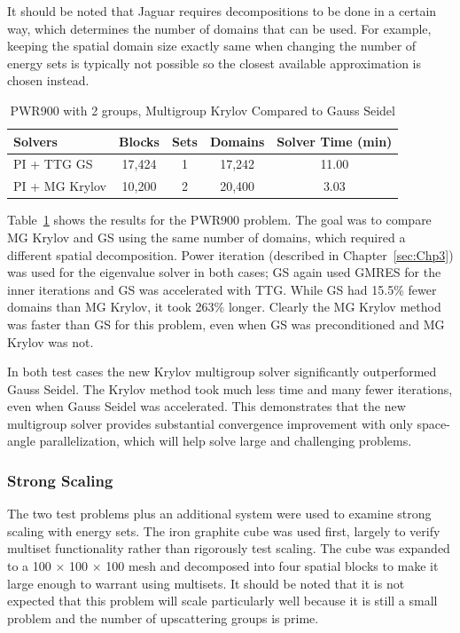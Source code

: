 It should be noted that Jaguar requires decompositions to be done in a certain way, which determines the number of domains that can be used. For example, keeping the spatial domain size exactly same when changing the number of energy sets is typically not possible so the closest available approximation is chosen instead.

\begin{table}[!h]
\caption{PWR900 with 2 groups, Multigroup Krylov Compared to Gauss Seidel}
\begin{center}
\begin{tabular}{l c c c c}
\hline
Solvers & Blocks & Sets & Domains & Solver Time (min) \\[0.5ex]
\hline
PI + TTG GS & 17,424 & 1 & 17,242 & 11.00 \\
PI + MG Krylov & 10,200 & 2 & 20,400 & 3.03 \\
\hline
\end{tabular}
\end{center}
\label{table:MGkrylovPWR}
\end{table}
%
Table~\ref{table:MGkrylovPWR} shows the results for the PWR900 problem. The goal was to compare MG Krylov and GS using the same number of domains, which required a different spatial decomposition. Power iteration (described in Chapter~\ref{sec:Chp3}) was used for the eigenvalue solver in both cases; GS again used GMRES for the inner iterations and GS was accelerated with TTG. While GS had 15.5\% fewer domains than MG Krylov, it took 263\% longer. Clearly the MG Krylov method was faster than GS for this problem, even when GS was preconditioned and MG Krylov was not. 

In both test cases the new Krylov multigroup solver significantly outperformed Gauss Seidel. The Krylov method took much less time and many fewer iterations, even when Gauss Seidel was accelerated. This demonstrates that the new multigroup solver provides substantial convergence improvement with only space-angle parallelization, which will help solve large and challenging problems. 

\subsubsection{Strong Scaling}
The two test problems plus an additional system were used to examine strong scaling with energy sets. The iron graphite cube was used first, largely to verify multiset functionality rather than rigorously test scaling. The cube was expanded to a 100 $\times$ 100 $\times$ 100 mesh and decomposed into four spatial blocks to make it large enough to warrant using multisets. It should be noted that it is not expected that this problem will scale particularly well because it is still a small problem and the number of upscattering groups is prime. 

